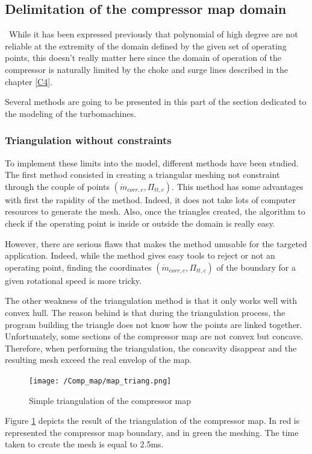 \subsection{Delimitation of the compressor map domain}
\quad\ While it has been expressed previously that polynomial of high degree are not reliable at the extremity of the domain defined by the given set of operating points, this doesn't really matter here since the domain of operation of the compressor is naturally limited by the choke and surge lines described in the chapter \ref{C4}.

Several methods are going to be presented in this part of the section dedicated to the modeling of the turbomachines. 
\subsubsection{Triangulation without constraints}
To implement these limits into the model, different methods have been studied. The first method consisted in creating a triangular meshing not constraint through the couple of points $(\dot{m}_{corr,c},\Pi_{tt,c})$. This method has some advantages with first the rapidity of the method. Indeed, it does not take lots of computer resources to generate the mesh. Also, once the triangles created, the algorithm to check if the operating point is inside or outside the domain is really easy.

However, there are serious flaws that makes the method unusable for the targeted application. Indeed, while the method gives easy tools to reject or not an operating point, finding the coordinates $(\dot{m}_{corr,c},\Pi_{tt,c})$ of the boundary for a given rotational speed is more tricky. 

The other weakness of the triangulation method is that it only works well with convex hull. The reason behind is that during the triangulation process, the program building the triangle does not know how the points are linked together. Unfortunately, some sections of the compressor map are not convex but concave. Therefore, when performing the triangulation, the concavity disappear and the resulting mesh exceed the real envelop of the map.

\begin{figure}[h]
    \centering
    \texttt{[image: /Comp\_map/map\_triang.png]}
    \caption{Simple triangulation of the compressor map}
    \label{fig:C7_trimap}
\end{figure}

Figure \ref{fig:C7_trimap} depicts the result of the triangulation of the compressor map. In red is represented the compressor map boundary, and in green the meshing. The time taken to create the mesh is equal to 2.5ms.

